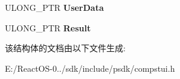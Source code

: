 \begin{DoxyCompactItemize}
\begin{tabbing}
\end{tabbing}\item 
\mbox{\label{struct___c_p_s_u_i_c_b_p_a_r_a_m_a327e7e48ab777874d2e66478bfdaf027}} 
U\+L\+O\+N\+G\+\_\+\+P\+TR {\bfseries User\+Data}
\item 
\mbox{\label{struct___c_p_s_u_i_c_b_p_a_r_a_m_ad124f25aef5dc43adbea9f9b76c678a4}} 
U\+L\+O\+N\+G\+\_\+\+P\+TR {\bfseries Result}
\end{DoxyCompactItemize}


该结构体的文档由以下文件生成\+:\begin{DoxyCompactItemize}
\item 
E\+:/\+React\+O\+S-\/0../sdk/include/psdk/compstui.\+h\end{DoxyCompactItemize}
